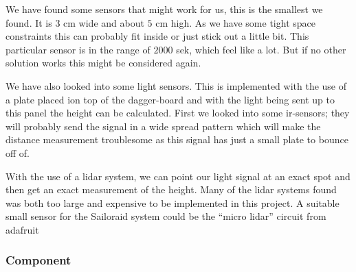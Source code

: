 We have found some sensors that might work for us, this is the smallest we found. It is $3$ cm wide and about $5$ cm high. As we have some tight space constraints this can probably fit inside or just stick out a little bit. This particular sensor is in the range of $2000$ \gls{sek}, which feel like a lot. But if no other solution works this might be considered again.  


We have also looked into some light sensors. This is implemented with the use of a plate placed ion top of the dagger-board and with the light being sent up to this panel the height can be calculated. First we looked into some \gls{ir}-sensors; they will probably send the signal in a wide spread pattern which will make the distance measurement troublesome as this signal has just a small plate to bounce off of.  
  
With the use of a \gls{lidar} system, we can point our light signal at an exact spot and then get an exact measurement of the height.  
Many of the \gls{lidar} systems found was both too large and expensive to be implemented in this project.
A suitable small sensor for the Sailoraid system could be the ``micro \gls{lidar}'' circuit from adafruit%

\subsubsection{Component}%


